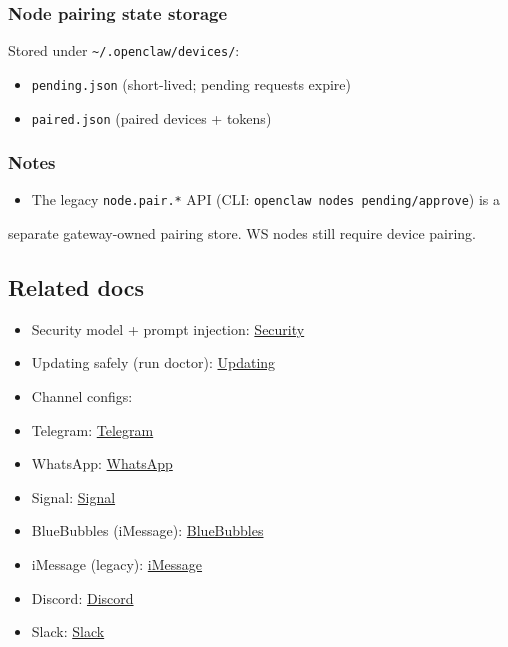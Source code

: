 \subsubsection{Node pairing state storage}


Stored under \texttt{\textasciitilde{}/.openclaw/devices/}:

\begin{itemize}
  \item \texttt{pending.json} (short-lived; pending requests expire)
  \item \texttt{paired.json} (paired devices + tokens)
\end{itemize}


\subsubsection{Notes}


\begin{itemize}
  \item The legacy \texttt{node.pair.*} API (CLI: \texttt{openclaw nodes pending/approve}) is a
\end{itemize}

separate gateway-owned pairing store. WS nodes still require device pairing.

\subsection{Related docs}


\begin{itemize}
  \item Security model + prompt injection: \href{/gateway/security}{Security}
  \item Updating safely (run doctor): \href{/install/updating}{Updating}
  \item Channel configs:
  \item Telegram: \href{/channels/telegram}{Telegram}
  \item WhatsApp: \href{/channels/whatsapp}{WhatsApp}
  \item Signal: \href{/channels/signal}{Signal}
  \item BlueBubbles (iMessage): \href{/channels/bluebubbles}{BlueBubbles}
  \item iMessage (legacy): \href{/channels/imessage}{iMessage}
  \item Discord: \href{/channels/discord}{Discord}
  \item Slack: \href{/channels/slack}{Slack}
\end{itemize}



